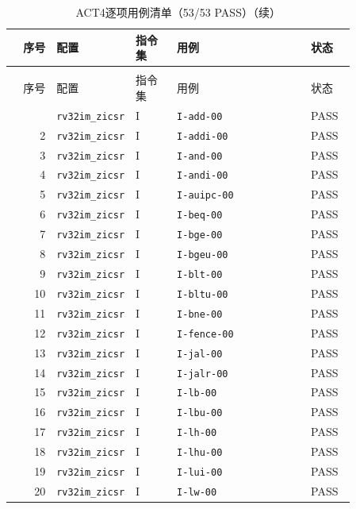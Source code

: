 \begin{reporttable}
\begin{longtable}{@{}r p{0.22\linewidth}p{0.12\linewidth}p{0.39\linewidth}p{0.13\linewidth}@{}}
\caption{ACT4逐项用例清单（53/53 PASS）}\label{tbl:cpu-act4-cases}\\
\toprule
序号 & 配置 & 指令集 & 用例 & 状态 \\
\midrule
\endfirsthead
\caption[]{ACT4逐项用例清单（53/53 PASS）（续）}\\
\toprule
序号 & 配置 & 指令集 & 用例 & 状态 \\
\midrule
\endhead
\bottomrule
\endfoot
1 & \texttt{rv32im\_zicsr} & I & \texttt{I-add-00} & PASS \\
2 & \texttt{rv32im\_zicsr} & I & \texttt{I-addi-00} & PASS \\
3 & \texttt{rv32im\_zicsr} & I & \texttt{I-and-00} & PASS \\
4 & \texttt{rv32im\_zicsr} & I & \texttt{I-andi-00} & PASS \\
5 & \texttt{rv32im\_zicsr} & I & \texttt{I-auipc-00} & PASS \\
6 & \texttt{rv32im\_zicsr} & I & \texttt{I-beq-00} & PASS \\
7 & \texttt{rv32im\_zicsr} & I & \texttt{I-bge-00} & PASS \\
8 & \texttt{rv32im\_zicsr} & I & \texttt{I-bgeu-00} & PASS \\
9 & \texttt{rv32im\_zicsr} & I & \texttt{I-blt-00} & PASS \\
10 & \texttt{rv32im\_zicsr} & I & \texttt{I-bltu-00} & PASS \\
11 & \texttt{rv32im\_zicsr} & I & \texttt{I-bne-00} & PASS \\
12 & \texttt{rv32im\_zicsr} & I & \texttt{I-fence-00} & PASS \\
13 & \texttt{rv32im\_zicsr} & I & \texttt{I-jal-00} & PASS \\
14 & \texttt{rv32im\_zicsr} & I & \texttt{I-jalr-00} & PASS \\
15 & \texttt{rv32im\_zicsr} & I & \texttt{I-lb-00} & PASS \\
16 & \texttt{rv32im\_zicsr} & I & \texttt{I-lbu-00} & PASS \\
17 & \texttt{rv32im\_zicsr} & I & \texttt{I-lh-00} & PASS \\
18 & \texttt{rv32im\_zicsr} & I & \texttt{I-lhu-00} & PASS \\
19 & \texttt{rv32im\_zicsr} & I & \texttt{I-lui-00} & PASS \\
20 & \texttt{rv32im\_zicsr} & I & \texttt{I-lw-00} & PASS \\

\end{longtable}
\end{reporttable}
